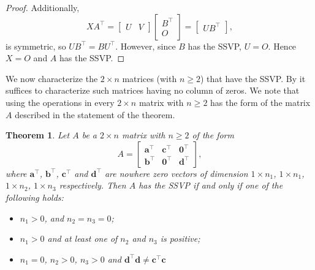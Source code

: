 \documentclass[preprint,12pt]{elsarticle}
\newcommand{\trans  }{^\top}
\newtheorem{theorem}{Theorem}[section]
\begin{document}
\begin{proof}
Additionally, 
 \[ 
 XA\trans  = \left[\begin{array}{c|c}
 U & V
 \end{array}\right] \left[\begin{array}{c}
      B\trans  \\
      \hline
     O
 \end{array} \right] = \left[\begin{array}{c}
 UB\trans 
 \end {array}
 \right],
\]
is symmetric, so $UB\trans  = BU\trans $. However, since $B$ has the SSVP, $U = O$. Hence $X = O$ and $A$ has the SSVP.
\end{proof}

We now characterize the $2\times n$ matrices (with $n\geq 2$) that have the SSVP.
By  it suffices to characterize such matrices having no column of zeros.
We note that using the operations in  every $2\times n$ matrix with $n\geq 2$ has the form 
of the matrix $A$ described in the statement of the theorem.

\begin{theorem}
Let $A$ be a $2\times n$ matrix with $n\geq 2$ of the form 
\[
A= \left[ \begin{array}{ccc} 
\mathbf a\trans  & \mathbf c\trans  & \mathbf 0\trans   \\
\mathbf b\trans  & \mathbf 0\trans & \mathbf d\trans   \end{array} \right],\]
where  $ \mathbf a\trans$, $\mathbf b \trans$, $\mathbf c\trans$ and
 $\mathbf d\trans$ are nowhere zero vectors of dimension $1\times n_1$, $1 \times n_1$, $1\times n_2$, $1 \times n_3$ respectively.  Then $A$ has  the  SSVP if and only if one of the following holds:
\begin{itemize}
\item[\rm (a)] $n_1>0$, and $n_2=n_3=0$;
\item[\rm (b)]$n_1>0$ and at least one of $n_2$ and $n_3$ is positive; 
\item[\rm (c)] $n_1=0$, $n_2>0$, $n_3>0$ and $\mathbf d\trans  \mathbf d \neq \mathbf c\trans \mathbf c$
\end{itemize}
\end{theorem} 
\end{document}
